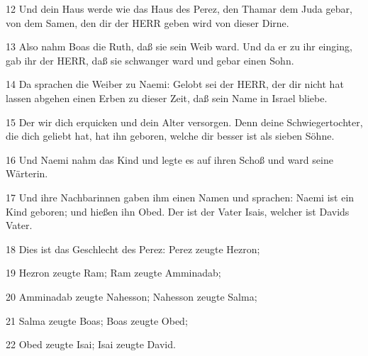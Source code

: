 \par 12 Und dein Haus werde wie das Haus des Perez, den Thamar dem Juda gebar, von dem Samen, den dir der HERR geben wird von dieser Dirne.
\par 13 Also nahm Boas die Ruth, daß sie sein Weib ward. Und da er zu ihr einging, gab ihr der HERR, daß sie schwanger ward und gebar einen Sohn.
\par 14 Da sprachen die Weiber zu Naemi: Gelobt sei der HERR, der dir nicht hat lassen abgehen einen Erben zu dieser Zeit, daß sein Name in Israel bliebe.
\par 15 Der wir dich erquicken und dein Alter versorgen. Denn deine Schwiegertochter, die dich geliebt hat, hat ihn geboren, welche dir besser ist als sieben Söhne.
\par 16 Und Naemi nahm das Kind und legte es auf ihren Schoß und ward seine Wärterin.
\par 17 Und ihre Nachbarinnen gaben ihm einen Namen und sprachen: Naemi ist ein Kind geboren; und hießen ihn Obed. Der ist der Vater Isais, welcher ist Davids Vater.
\par 18 Dies ist das Geschlecht des Perez: Perez zeugte Hezron;
\par 19 Hezron zeugte Ram; Ram zeugte Amminadab;
\par 20 Amminadab zeugte Nahesson; Nahesson zeugte Salma;
\par 21 Salma zeugte Boas; Boas zeugte Obed;
\par 22 Obed zeugte Isai; Isai zeugte David.


